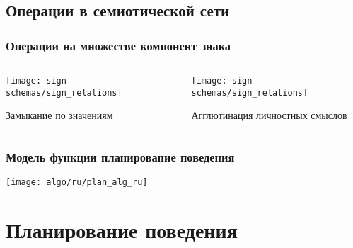 \documentclass[default]{beamer}
\begin{document}
	\subsection{Операции в семиотической сети}	

	\begin{frame}
		\frametitle{Операции на множестве компонент знака}
		
		\begin{columns}
			\begin{column}{0.5\textwidth}
				\centering
				\texttt{[image: sign-schemas/sign\_relations]}
				\par\bigskip
				Замыкание по значениям
			\end{column}
			\begin{column}{0.5\textwidth}
				\centering
				\texttt{[image: sign-schemas/sign\_relations]}
				\par\bigskip
				Агглютинация личностных смыслов
			\end{column}
		\end{columns}
		\nocite{*}
		\printbibliography[keyword={signoper}, resetnumbers=true]
	\end{frame}	
	
	\begin{frame}
		\frametitle{Модель функции планирование поведения}
		\centering
		\texttt{[image: algo/ru/plan\_alg\_ru]}
		\nocite{*}
		\printbibliography[keyword={signb}, resetnumbers=true]
		\nocite{*}
		\printbibliography[keyword={symbsign}, resetnumbers=true]
	\end{frame}	
	
	\section{Планирование поведения}
\end{document}
